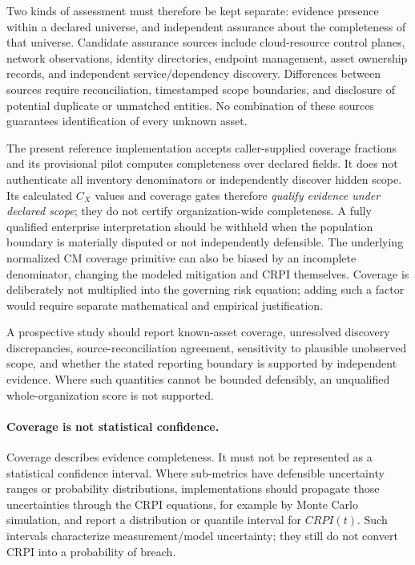\documentclass[11pt]{article}
\begin{document}
Two kinds of assessment must therefore be kept separate: evidence
presence within a declared universe, and independent assurance about
the completeness of that universe. Candidate assurance sources include
cloud-resource control planes, network observations, identity
directories, endpoint management, asset ownership records, and
independent service/dependency discovery. Differences between sources
require reconciliation, timestamped scope boundaries, and disclosure
of potential duplicate or unmatched entities. No combination of these
sources guarantees identification of every unknown asset.

The present reference implementation accepts caller-supplied coverage
fractions and its provisional pilot computes completeness over
declared fields. It does not authenticate all inventory denominators
or independently discover hidden scope. Its calculated $C_X$ values
and coverage gates therefore \emph{qualify evidence under declared
scope}; they do not certify organization-wide completeness. A
fully qualified enterprise interpretation should be withheld when
the population boundary is materially disputed or not independently
defensible. The underlying normalized CM coverage primitive can
also be biased by an incomplete denominator, changing the modeled
mitigation and CRPI themselves. Coverage is deliberately not
multiplied into the governing risk equation; adding such a factor
would require separate mathematical and empirical justification.

A prospective study should report known-asset coverage, unresolved
discovery discrepancies, source-reconciliation agreement, sensitivity
to plausible unobserved scope, and whether the stated reporting
boundary is supported by independent evidence. Where such quantities
cannot be bounded defensibly, an unqualified whole-organization
score is not supported.

\paragraph{Coverage is not statistical confidence.}
Coverage describes evidence completeness. It must not be represented as a statistical
confidence interval. Where sub-metrics have defensible uncertainty ranges or
probability distributions, implementations should propagate those uncertainties through
the CRPI equations, for example by Monte Carlo simulation, and report a distribution or
quantile interval for $CRPI(t)$. Such intervals characterize measurement/model
uncertainty; they still do not convert CRPI into a probability of breach.
\end{document}

